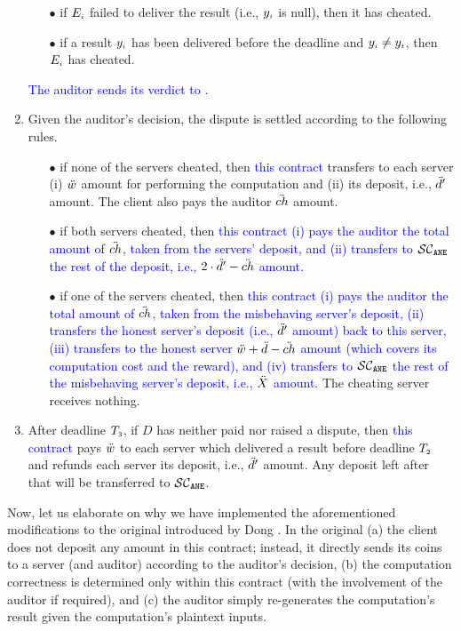 \begin{enumerate}
%
\begin{itemize}
%
\item[$\bullet$] if $E_{\scriptscriptstyle i}$ failed to deliver the result (i.e., $y_{\scriptscriptstyle i}$ is null), then it has cheated. 
%
\item[$\bullet$] if a result $y_{\scriptscriptstyle i}$ has been delivered before the deadline and $y_{\scriptscriptstyle i}\neq y_{\scriptscriptstyle t}$, then $E_{\scriptscriptstyle i}$ has cheated. 
%
\end{itemize}
%
\textcolor{blue}{The auditor sends its verdict to \SCpc.} 
%
\item Given the auditor's decision, the dispute is settled according to the following rules.
%
\begin{itemize}
%
\item[$\bullet$] if none of the servers cheated, then \textcolor{blue}{this contract} transfers to each server (i) $\ddot{w}$ amount for performing the computation and (ii) its deposit, i.e., $\ddot{d}'$ amount. The client also pays the auditor $\ddot{ch}$ amount.  
%
\item[$\bullet$] if both servers cheated, then \textcolor{blue}{this contract (i) pays the auditor the total amount of $\ddot{ch}$, taken from the servers' deposit, and (ii) transfers to  $\mathcal{SC}_{\mathtt{ANE}}$ the rest of the deposit, i.e., $2\cdot \ddot{d}'-\ddot{ch}$ amount.} 
%
\item[$\bullet$] if one of the servers cheated, then \textcolor{blue}{this contract (i) pays the auditor the total amount of $\ddot{ch}$, taken from the misbehaving server's deposit, (ii) transfers the honest server's deposit (i.e., $\ddot{d}'$ amount) back to this server,  (iii) transfers to the honest server $\ddot{w}+\ddot{d}-\ddot{ch}$ amount (which covers its computation cost and the reward), and  (iv) transfers to $\mathcal{SC}_{\mathtt{ANE}}$ the rest of the misbehaving server's deposit, i.e., $\ddot{X}$ amount.} The cheating server receives nothing.  
%
\end{itemize} 
%
\item After deadline $T_{\scriptscriptstyle 3}$, if $ { D}$ has neither paid nor raised a dispute, then \textcolor{blue}{this contract} pays $\ddot{w}$ to each server which delivered a result before deadline $T_{\scriptscriptstyle 2}$ and refunds each server its deposit, i.e., $\ddot{d}'$ amount. Any deposit left after that will be transferred to \textcolor{blue}{$\mathcal{SC}_{\mathtt{ANE}}$}. 
%
\end{enumerate}


Now, let us elaborate on why we have implemented the aforementioned modifications to the original \SCpc introduced by Dong \et \cite{dong2017betrayal}. In the original \SCpc (a) the client does not deposit any amount in this contract; instead, it directly sends its coins to a server (and auditor) according to the auditor's decision,  (b) the computation correctness is determined only within this contract (with the involvement of the auditor if required), and (c)  the auditor simply re-generates the computation's result given the computation's plaintext inputs.  

